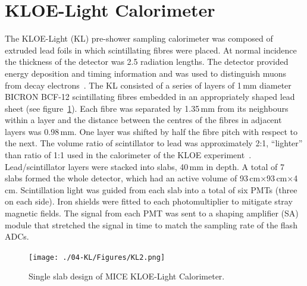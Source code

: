 \graphicspath{ {04-KL/Figures/} }

\section{KLOE-Light Calorimeter}
\label{Sect:KL}

The KLOE-Light (KL) pre-shower sampling calorimeter was composed of
extruded lead foils in which scintillating fibres were placed.
At normal incidence the thickness of the detector was 2.5 radiation
lengths.
The detector provided energy deposition and timing information and was
used to distinguish muons from decay
electrons~\cite{2016JInst..11P3001A}.
The KL consisted of a series of layers of 1\,mm diameter BICRON BCF-12
scintillating fibres embedded in an appropriately shaped lead sheet
(see figure~\ref{fig:KL2}).
Each fibre was separated by 1.35\,mm from its neighbours within a
layer and the distance between the centres of the fibres in adjacent
layers was 0.98\,mm.
One layer was shifted by half the fibre pitch with respect to the next.
The volume ratio of scintillator to lead was approximately 2:1,
``lighter'' than ratio of 1:1 used in the calorimeter of the KLOE
experiment~\cite{Ambrosino:2009zza}. 
Lead/scintillator layers were stacked into slabs, 40\,mm in depth.
A total of 7 slabs formed the whole detector, which had an active
volume of 93\,cm$\times$93\,cm$\times$4\,cm.
Scintillation light was guided from each slab into a total of six PMTs
(three on each side).
Iron shields were fitted to each photomultiplier to mitigate stray magnetic fields.
The signal from each PMT was sent to a shaping amplifier (SA) module
that stretched the signal in time to match the sampling rate
of the flash ADCs. \\
\begin{figure}
  \begin{center}
    \texttt{[image: ./04-KL/Figures/KL2.png]}
    \caption{Single slab design of MICE KLOE-Light Calorimeter.}
    \label{fig:KL2}
  \end{center}
\end{figure}

